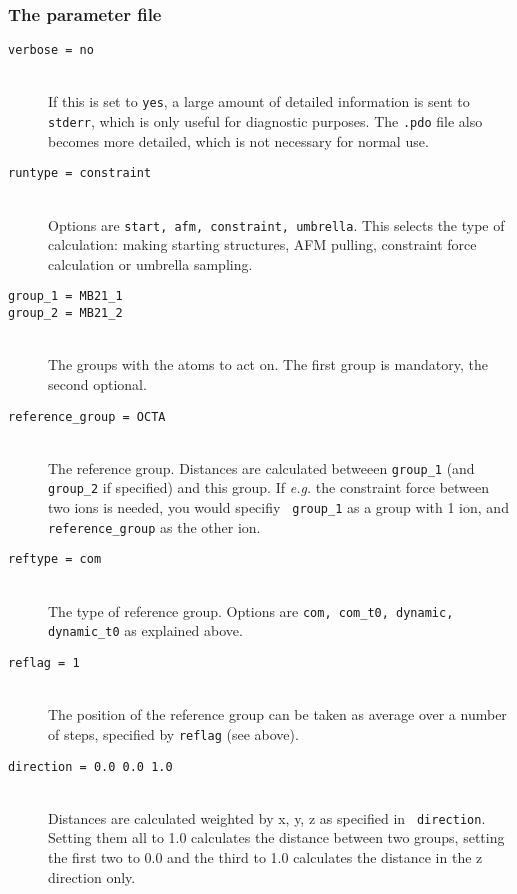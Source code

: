 \subsubsection{The parameter file}

\begin{description}
\item[\tt verbose                  = no]\mbox{}\\
If this is set to {\tt yes}, a large amount of detailed information
is sent to {\tt stderr}, which is only useful for diagnostic
purposes. The {\tt .pdo} file also becomes more detailed, which is not
necessary for normal use.

\item[\tt runtype                  = constraint]\mbox{}\\
Options are {\tt start, afm, constraint, umbrella}. This selects the
type of calculation: making starting structures, AFM pulling,
constraint force calculation or umbrella sampling.

\item[\tt group\_1                  = MB21\_1]
\item[\tt group\_2                  = MB21\_2]\mbox{}\\			
The groups with the atoms to act on. The first group is mandatory, the
second optional.

\item[\tt reference\_group          = OCTA]\mbox{}\\
The reference group. Distances are calculated betweeen {\tt group\_1}
(and {\tt group\_2} if specified) and this group. If \emph{e.g.} the
constraint force between two ions is needed, you would specifiy {\tt
group\_1} as a group with 1 ion, and {\tt reference\_group} as the other
ion.

\item[\tt reftype                  = com]\mbox{}\\
The type of reference group. Options are {\tt com, com\_t0, dynamic,
dynamic\_t0} as explained above. 

\item[\tt reflag                   = 1]\mbox{}\\
The position of the reference group can be taken as average over a
number of steps, specified by {\tt reflag} (see above).

\item[\tt direction                = 0.0 0.0 1.0]\mbox{}\\
Distances are calculated weighted by x, y, z as specified in {\tt
direction}. Setting them all to 1.0 calculates the distance between
two groups, setting the first two to 0.0 and the third to 1.0
calculates the distance in the z direction only.


\end{description}
